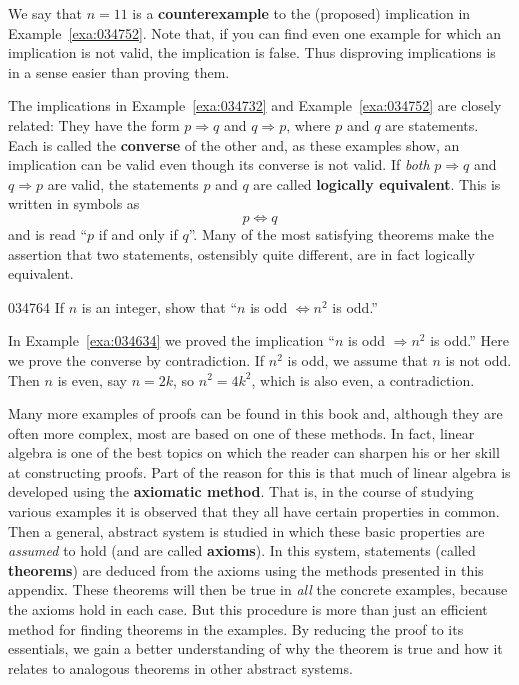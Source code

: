 \noindent We say that $n = 11$ is a \textbf{counterexample} to the (proposed) implication in Example~\ref{exa:034752}.
 Note that, if you can find even one example for which an implication is
 not valid, the implication is false. Thus disproving implications is in
 a sense easier than proving them.


The implications in Example~\ref{exa:034732} and Example~\ref{exa:034752} are closely related: They have the form $p \Rightarrow q$ and $q \Rightarrow p$, where $p$ and $q$ are statements. Each is called the \textbf{converse} of the other and, as these examples show, an implication can be valid even though its converse is not valid. If \textit{both} $p \Rightarrow q$ and $q \Rightarrow p$ are valid, the statements $p$ and $q$ are called \textbf{logically equivalent}. This is written in symbols as
\begin{equation*}
p \Leftrightarrow q
\end{equation*}
and is read ``$p$ if and only if $q$''. Many of the most 
satisfying theorems make the assertion that two statements, ostensibly 
quite different, are in fact logically equivalent.


\begin{example}{}{034764}
If $n$ is an integer, show that ``$n$ is odd $\Leftrightarrow n^{2}$ is odd.''


\begin{solution}
  In Example~\ref{exa:034634} we proved the implication ``$n$ is odd $\Rightarrow n^{2}$ is odd.'' Here we prove the converse by contradiction. If $n^{2}$ is odd, we assume that $n$ is not odd. Then $n$ is even, say $n = 2k$, so $n^{2} = 4k^{2}$, which is also even, a contradiction.
\end{solution}
\end{example}

Many more examples of proofs can be 
found in this book and, although they are often more complex, most are 
based on one of these methods. In fact, linear algebra is one of the 
best topics on which the reader can sharpen his or her skill at 
constructing proofs. Part of the reason for this is that much of linear 
algebra is developed using the \textbf{axiomatic method}. That is, in the 
course of studying various examples it is observed that they all have 
certain properties in common. Then a general, abstract system is studied
 in which these basic properties are \textit{assumed} to hold (and are called \textbf{axioms}). In this system, statements (called \textbf{theorems}) are deduced from the axioms using the methods presented in this appendix. These theorems will then be true in \textit{all}
 the concrete examples, because the axioms hold in each case. But this 
procedure is more than just an efficient method for finding theorems in 
the examples. By reducing the proof to its essentials, we gain a better 
understanding of why the theorem is true and how it relates to analogous
 theorems in other abstract systems.



